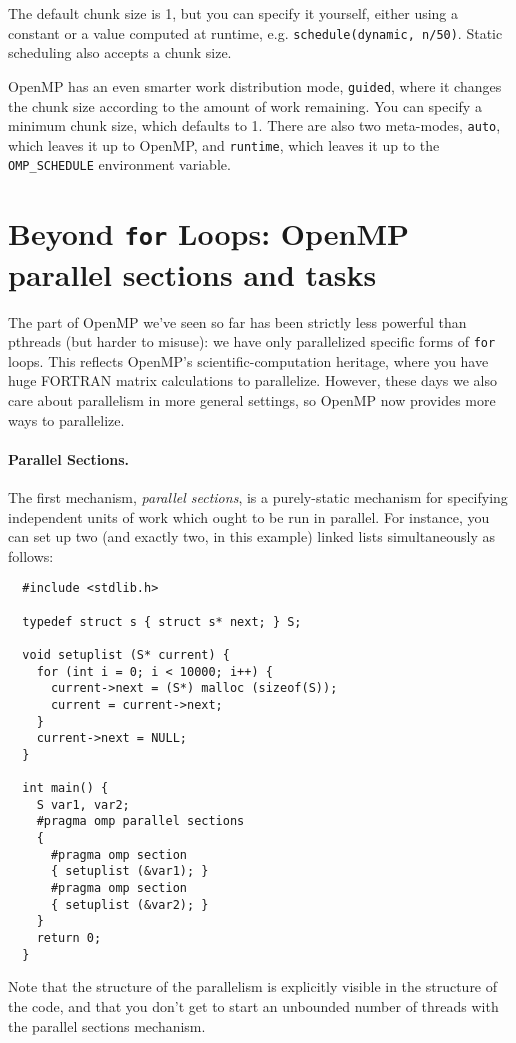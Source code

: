 The default chunk size is 1, but you can specify it yourself, either
using a constant or a value computed at runtime, e.g. 
{\tt schedule(dynamic, n/50)}. Static scheduling also accepts a
chunk size.

OpenMP has an even smarter work distribution mode, {\tt guided}, where
it changes the chunk size according to the amount of work remaining.
You can specify a minimum chunk size, which defaults to 1. There
are also two meta-modes, {\tt auto}, which leaves it up to OpenMP, and
{\tt runtime}, which leaves it up to the \verb+OMP_SCHEDULE+ environment
variable.

\section*{Beyond {\tt for} Loops: OpenMP parallel sections and tasks}
The part of OpenMP we've seen so far has been strictly less powerful
than pthreads (but harder to misuse): we have only parallelized
specific forms of {\tt for} loops. This reflects OpenMP's
scientific-computation heritage, where you have huge FORTRAN matrix
calculations to parallelize. However, these days we also care about
parallelism in more general settings, so OpenMP now provides
more ways to parallelize.

\paragraph{Parallel Sections.} The first mechanism, \emph{parallel sections},
is a purely-static mechanism for specifying independent units of work
which ought to be run in parallel. For instance, you can set up two 
(and exactly two, in this example) linked lists simultaneously as follows:

{\small
\begin{verbatim}
  #include <stdlib.h>

  typedef struct s { struct s* next; } S;

  void setuplist (S* current) {
    for (int i = 0; i < 10000; i++) {
      current->next = (S*) malloc (sizeof(S));
      current = current->next;
    }
    current->next = NULL;
  }

  int main() {
    S var1, var2;
    #pragma omp parallel sections
    {
      #pragma omp section
      { setuplist (&var1); }
      #pragma omp section
      { setuplist (&var2); }
    }
    return 0;
  }
\end{verbatim}
}
Note that the structure of the parallelism is explicitly visible in the
structure of the code, and that you don't get to start an unbounded 
number of threads with the parallel sections mechanism.


